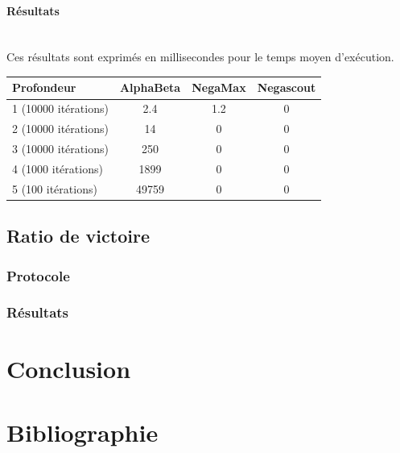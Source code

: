 \huge\documentclass{article}
\begin{document}
    \paragraph{Résultats}
    ~~\\
    \newline
    Ces résultats sont exprimés en millisecondes pour le temps moyen d'exécution.
    \begin{center}
        \begin{tabular}{ | l | c | c | c | }
            \hline
            Profondeur & AlphaBeta & NegaMax & Negascout \\ \hline
            1 (10000 itérations) & 2.4 & 1.2 & 0 \\ \hline
            2 (10000 itérations) & 14 & 0 & 0\\ \hline
            3 (10000 itérations) & 250 & 0 & 0\\ \hline
            4 (1000 itérations) & 1899 & 0 & 0\\ \hline
            5 (100 itérations) & 49759 & 0 & 0\\
            \hline
        \end{tabular}
    \end{center}

    \subsection{Ratio de victoire}
    \subsubsection{Protocole}
    \subsubsection{Résultats}

    \section{Conclusion}

    \section{Bibliographie}

    
    
\end{document}
